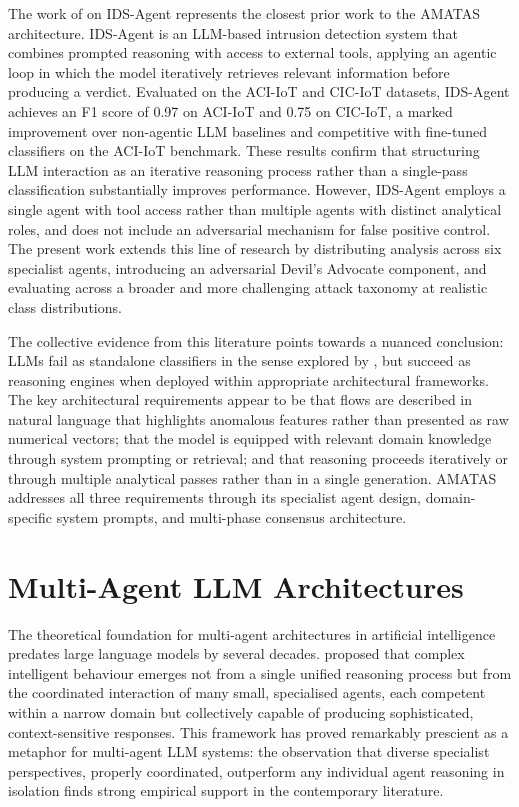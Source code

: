 The work of \textcite{Li2024} on IDS-Agent represents the closest prior work to the AMATAS architecture. IDS-Agent is an LLM-based intrusion detection system that combines prompted reasoning with access to external tools, applying an agentic loop in which the model iteratively retrieves relevant information before producing a verdict. Evaluated on the ACI-IoT and CIC-IoT datasets, IDS-Agent achieves an F1 score of 0.97 on ACI-IoT and 0.75 on CIC-IoT, a marked improvement over non-agentic LLM baselines and competitive with fine-tuned classifiers on the ACI-IoT benchmark. These results confirm that structuring LLM interaction as an iterative reasoning process rather than a single-pass classification substantially improves performance. However, IDS-Agent employs a single agent with tool access rather than multiple agents with distinct analytical roles, and does not include an adversarial mechanism for false positive control. The present work extends this line of research by distributing analysis across six specialist agents, introducing an adversarial Devil's Advocate component, and evaluating across a broader and more challenging attack taxonomy at realistic class distributions.

The collective evidence from this literature points towards a nuanced conclusion: LLMs fail as standalone classifiers in the sense explored by \textcite{Houssel2024}, but succeed as reasoning engines when deployed within appropriate architectural frameworks. The key architectural requirements appear to be that flows are described in natural language that highlights anomalous features rather than presented as raw numerical vectors; that the model is equipped with relevant domain knowledge through system prompting or retrieval; and that reasoning proceeds iteratively or through multiple analytical passes rather than in a single generation. AMATAS addresses all three requirements through its specialist agent design, domain-specific system prompts, and multi-phase consensus architecture.

\section{Multi-Agent LLM Architectures}
\label{sec:multi-agent-architectures}

The theoretical foundation for multi-agent architectures in artificial intelligence predates large language models by several decades. \textcite{Minsky1986} proposed that complex intelligent behaviour emerges not from a single unified reasoning process but from the coordinated interaction of many small, specialised agents, each competent within a narrow domain but collectively capable of producing sophisticated, context-sensitive responses. This framework has proved remarkably prescient as a metaphor for multi-agent LLM systems: the observation that diverse specialist perspectives, properly coordinated, outperform any individual agent reasoning in isolation finds strong empirical support in the contemporary literature.

